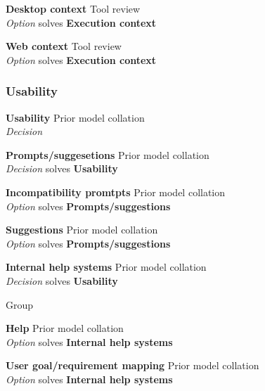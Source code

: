 \textbf{Desktop context} \hfill Tool review \\ \emph{Option} \hfill solves \textbf{Execution context}

\textbf{Web context} \hfill Tool review \\ \emph{Option} \hfill solves \textbf{Execution context}

\subsubsection{Usability}

\textbf{Usability} \hfill Prior model collation \cite{Aghaee2012} \\ \emph{Decision} \hfill 

\textbf{Prompts/suggesetions} \hfill Prior model collation \cite{Minhas2012} \\ \emph{Decision} \hfill solves \textbf{Usability}

\textbf{Incompatibility promtpts} \hfill Prior model collation \cite{Minhas2012} \\ \emph{Option} \hfill solves \textbf{Prompts/suggestions}


\textbf{Suggestions} \hfill Prior model collation \cite{Minhas2012} \\ \emph{Option} \hfill solves \textbf{Prompts/suggestions}

\textbf{Internal help systems} \hfill Prior model collation \\ \emph{Decision} \hfill solves \textbf{Usability}

Group

\textbf{Help} \hfill Prior model collation \cite{Grammel2010} \\ \emph{Option} \hfill solves \textbf{Internal help systems}

\textbf{User goal/requirement mapping} \hfill Prior model collation \cite{Minhas2012} \\ \emph{Option} \hfill solves \textbf{Internal help systems}


